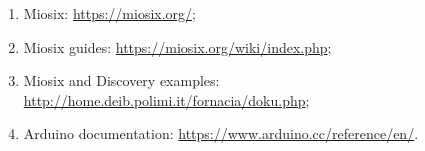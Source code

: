 \begin{enumerate}
	\item Miosix: \href{https://miosix.org/}{https://miosix.org/};
	\item Miosix guides: \href{https://miosix.org/wiki/index.php}{https://miosix.org/wiki/index.php};
	\item Miosix and Discovery examples: \href{http://home.deib.polimi.it/fornacia/doku.php}{http://home.deib.polimi.it/fornacia/doku.php};
	\item Arduino documentation: \href{https://www.arduino.cc/reference/en/}{https://www.arduino.cc/reference/en/}.
\end{enumerate}